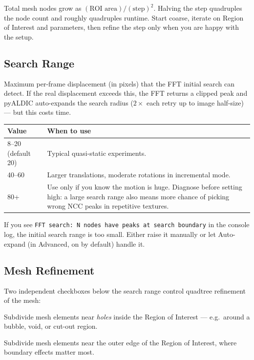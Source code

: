 \begin{tipbox}
Total mesh nodes grow as $(\text{ROI area}) / (\text{step})^2$.
Halving the step quadruples the node count and roughly quadruples
runtime. Start coarse, iterate on Region of Interest and parameters,
then refine the step only when you are happy with the setup.
\end{tipbox}

\subsection{Search Range}

Maximum per-frame displacement (in pixels) that the FFT initial
search can detect. If the real displacement exceeds this, the FFT
returns a clipped peak and pyALDIC auto-expands the search radius
($2\times$ each retry up to image half-size) --- but this costs
time.

\begin{center}
\begin{tabular}{lp{8cm}}
  \toprule
  Value & When to use \\
  \midrule
  8--20 (default 20) & Typical quasi-static experiments. \\
  40--60 & Larger translations, moderate rotations in incremental mode. \\
  80+ & Use only if you know the motion is huge. Diagnose before setting high: a large search range also means more chance of picking wrong NCC peaks in repetitive textures. \\
  \bottomrule
\end{tabular}
\end{center}

\begin{warnbox}
If you see \texttt{FFT search: N nodes have peaks at search boundary}
in the console log, the initial search range is too small. Either
raise it manually or let Auto-expand (in Advanced, on by default)
handle it.
\end{warnbox}

\subsection{Mesh Refinement}

Two independent checkboxes below the search range control quadtree
refinement of the mesh:

\begin{description}[leftmargin=1.2cm,style=nextline]
  \item[Refine Inner Boundary]
    Subdivide mesh elements near \emph{holes} inside the Region of
    Interest --- e.g.\ around a bubble, void, or cut-out region.
  \item[Refine Outer Boundary]
    Subdivide mesh elements near the outer edge of the Region of
    Interest, where boundary effects matter most.
\end{description}

